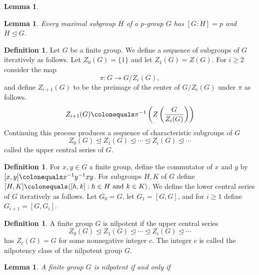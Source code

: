 \documentclass{dcthesis}
\newcommand{\defi}[1]{\textsf{#1}}
\numberwithin{equation}{section}
\newtheorem{lemma}[equation]{Lemma}
\theoremstyle{definition}
\newtheorem{definition}[equation]{Definition}
\theoremstyle{remark}
\begin{document}
{{{\begin{lemma}
    \end{lemma}
    \begin{lemma}
      \label{lem:maximalsubgroup}
      Every maximal subgroup $H$ of a $p$-group $G$
      has $[G:H]=p$ and $H\trianglelefteq G$.
    \end{lemma}
    \begin{definition}
      \label{def:uppercentralseries}
      Let $G$ be a finite group.
      We define a sequence of subgroups of $G$ iteratively as follows.
      Let $Z_0(G) = \{1\}$
      and let $Z_1(G) = Z(G)$.
      For $i\geq 2$ consider
      the map
      \[
        \pi\colon G\to G/Z_i(G),
      \]
      and define $Z_{i+1}(G)$ to be the preimage of the center of $G/Z_i(G)$ under $\pi$
      as follows.
      \[
        Z_{i+1}(G)\colonequals\pi^{-1}
        \left(Z\left(\frac{G}{Z_i(G)}\right)\right)
      \]
      Continuing this process produces a sequence of
      characteristic subgroups of $G$
      \[
        Z_0(G)\trianglelefteq Z_1(G)\trianglelefteq\cdots\trianglelefteq Z_{i}(G)\trianglelefteq\cdots
      \]
      called the \defi{upper central series} of $G$.
    \end{definition}
    \begin{definition}
      \label{def:lowercentralseries}
      For $x,y\in G$ a finite group,
      define the \defi{commutator of $x$ and $y$}
      by
      $[x,y]\colonequals x^{-1}y^{-1}xy$.
      For subgroups $H,K$ of $G$ define
      $[H,K]\colonequals\langle[h,k]:h\in H\text{ and }k\in K\rangle$.
      We define the \defi{lower central series} of $G$ iteratively as follows.
      Let $G_0=G$,
      let $G_1 = [G,G]$,
      and for $i\geq 1$ define
      $G_{i+1}=[G,G_i]$.
    \end{definition}
    \begin{definition}
      \label{def:nilpotentgroup}
      A finite group $G$ is \defi{nilpotent}
      if the upper central series
      \[
        Z_0(G)\trianglelefteq Z_1(G)\trianglelefteq\cdots\trianglelefteq Z_{i}(G)\trianglelefteq\cdots
      \]
      has $Z_c(G) = G$ for some nonnegative integer $c$.
      The integer $c$ is called the \defi{nilpotency class} of
      the nilpotent group $G$.
    \end{definition}
    \begin{lemma}
      \label{lem:upperlowernilpotent}
      A finite group $G$ is nilpotent if and only if

\end{lemma}}}}
\end{document}
